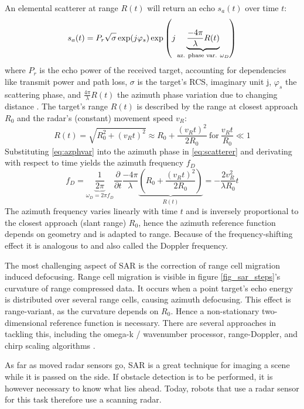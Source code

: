 An elemental scatterer at range \(R(t)\) will return an echo \(s_a(t)\)
over time \(t\): 
\begin{equation} \label{eq:scatterer}
	s_a(t) = P_r \sqrt{\sigma\vphantom{1}} \exp(j\varphi_s)\exp\left(j \underbrace{\frac{-4\pi}{\lambda}R(t)}_\text{az. phase var. $\omega_D$}\right)
\end{equation}
where \(P_r\) is the echo power of the received target, accounting
for dependencies like transmit power and path loss, \(\sigma\) is the
target's RCS, imaginary unit \si{j}, \(\varphi_s\) the scattering phase,
and \(\frac{4\pi}{\lambda}R(t)\) the azimuth phase variation due to
changing distance \cite{Cumming2004}. The target's range \(R(t)\) is
described by the range at closest approach \(R_0\) and the radar's
(constant) movement speed \(v_R\): 
\begin{equation} \label{eq:azphvar}
	R(t) = \sqrt{R_0^2+\left(v_Rt\right)^2} \approx R_0 + \frac{(v_Rt)^2}{2R_0} ~\text{for}~ \frac{v_Rt}{R_0} \ll 1
\end{equation}
Substituting \cref{eq:azphvar} into the azimuth phase in \cref{eq:scatterer} and derivating
with respect to time yields the azimuth frequency \(f_D\) 
\begin{equation}
	f_D = \underbrace{\frac{1}{2\pi}}_{\omega_D = 2\pi f_D} \frac{\partial}{\partial t} \frac{-4\pi}{\lambda}  \underbrace{\left( R_0 + \frac{(v_Rt)^2}{2R_0}  \right)}_{R(t)} = -\frac{2v_R^2}{\lambda R_0}t
\end{equation}
The azimuth frequency varies linearly with time \(t\) and is
inversely proportional to the closest approach (slant range) \(R_0\),
hence the azimuth reference function depends on geometry and is adapted
to range. Because of the frequency-shifting effect it is analogous to
and also called the Doppler frequency.

The most challenging aspect of SAR is the correction of range cell
migration induced defocusing. Range cell migration is visible in figure
\cref{fig_sar_steps}'s curvature of range compressed data. It occurs when a point
target's echo energy is distributed over several range cells, causing
azimuth defocusing. This effect is range-variant, as the curvature
depends on \(R_0\). Hence a non-stationary two-dimensional reference
function is necessary. There are several approaches in tackling this,
including the omega-k / wavenumber processor, range-Doppler, and chirp
scaling algorithms \cite{Moreira2013}.

As far as moved radar sensors go, SAR is a great technique for imaging a scene while it is passed on the side. If obstacle detection is to be performed, it is however necessary to know what lies ahead. Today, robots that use a radar sensor for this task therefore use a scanning radar.


